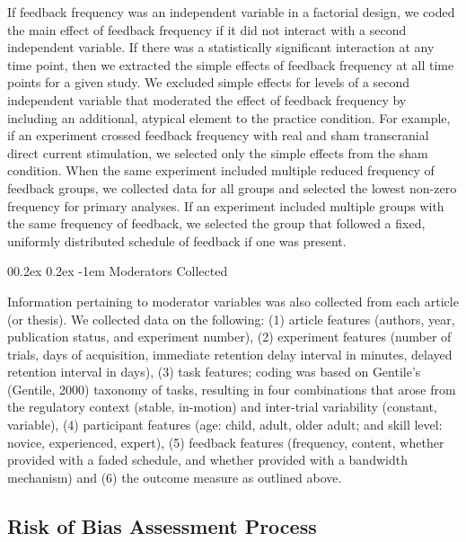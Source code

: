 \documentclass[
  english,
  man, donotrepeattitle,floatsintext]{apa7}
\makeatletter
\let\oldparagraph\paragraph
\renewcommand{\paragraph}[1]{\oldparagraph{#1}\mbox{}}
\renewcommand{\paragraph}{\@startsection{paragraph}{4}{\parindent}%
  {0\baselineskip \@plus 0.2ex \@minus 0.2ex}%
  {-1em}%
  {\normalfont\normalsize\bfseries\itshape\typesectitle}}
\makeatother
\begin{document}
If feedback frequency was an independent variable in a factorial design, we coded the main effect of feedback frequency if it did not interact with a second independent variable. If there was a statistically significant interaction at any time point, then we extracted the simple effects of feedback frequency at all time points for a given study. We excluded simple effects for levels of a second independent variable that moderated the effect of feedback frequency by including an additional, atypical element to the practice condition. For example, if an experiment crossed feedback frequency with real and sham transcranial direct current stimulation, we selected only the simple effects from the sham condition. When the same experiment included multiple reduced frequency of feedback groups, we collected data for all groups and selected the lowest non-zero frequency for primary analyses. If an experiment included multiple groups with the same frequency of feedback, we selected the group that followed a fixed, uniformly distributed schedule of feedback if one was present.

\hypertarget{moderators-collected}{%
\paragraph{Moderators Collected}\label{moderators-collected}}

Information pertaining to moderator variables was also collected from each article (or thesis). We collected data on the following: (1) article features (authors, year, publication status, and experiment number), (2) experiment features (number of trials, days of acquisition, immediate retention delay interval in minutes, delayed retention interval in days), (3) task features; coding was based on Gentile's (Gentile, 2000) taxonomy of tasks, resulting in four combinations that arose from the regulatory context (stable, in-motion) and inter-trial variability (constant, variable), (4) participant features (age: child, adult, older adult; and skill level: novice, experienced, expert), (5) feedback features (frequency, content, whether provided with a faded schedule, and whether provided with a bandwidth mechanism) and (6) the outcome measure as outlined above.

\hypertarget{risk-of-bias-assessment-process}{%
\subsection{Risk of Bias Assessment Process}\label{risk-of-bias-assessment-process}}
\end{document}
